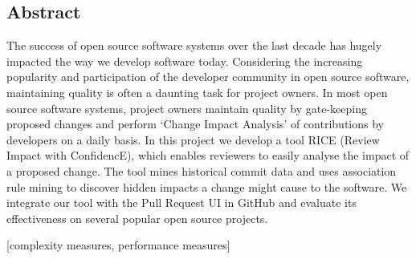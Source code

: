 
\subsection*{Abstract}
The success of open source software systems over the last decade has hugely impacted the way we develop software today. Considering the increasing popularity and participation of the developer community in open source software, maintaining quality is often a daunting task for project owners. In most open source software systems, project owners maintain quality by gate-keeping proposed changes and perform `Change Impact Analysis' of contributions by developers on a daily basis. In this project we develop a tool RICE (Review Impact with ConfidencE), which enables reviewers to easily analyse the impact of a proposed change. The tool mines historical commit data and uses association rule mining to discover hidden impacts a change might cause to the software. We integrate our tool with the Pull Request UI in GitHub and evaluate its effectiveness on several popular open source projects.



[complexity measures, performance measures]


